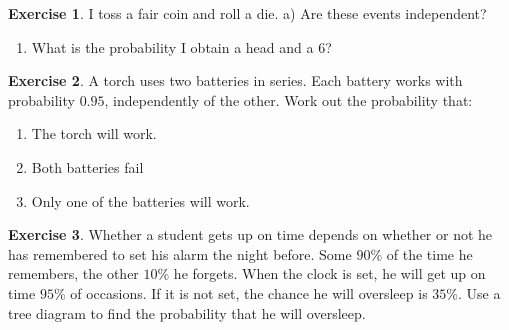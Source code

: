 \documentclass[
]{book}
\providecommand{\tightlist}{%
  \setlength{\itemsep}{0pt}\setlength{\parskip}{0pt}}
\theoremstyle{definition}
\theoremstyle{definition}
\theoremstyle{definition}
\newtheorem{exercise}{Exercise}[chapter]
\theoremstyle{definition}
\theoremstyle{remark}
\begin{document}
\begin{exercise}

I toss a fair coin and roll a die.
a) Are these events independent?

\begin{enumerate}
\def\labelenumi{\alph{enumi})}
\setcounter{enumi}{1}
\tightlist
\item
  What is the probability I obtain a head and a \(6\)?
\end{enumerate}

\end{exercise}

\begin{exercise}

A torch uses two batteries in series. Each battery works with probability \(0.95\), independently of the other. Work out the probability that:

\begin{enumerate}
\def\labelenumi{\alph{enumi})}
\item
  The torch will work.
\item
  Both batteries fail
\item
  Only one of the batteries will work.
\end{enumerate}

\end{exercise}

\begin{exercise}
Whether a student gets up on time depends on whether or not he has remembered to set his alarm the night before. Some \(90\%\) of the time he remembers, the other \(10\%\) he forgets. When the clock is set, he will get up on time \(95\%\) of occasions. If it is not set, the chance he will oversleep is \(35\%\). Use a tree diagram to find the probability that he will oversleep.
\end{exercise}
\end{document}
